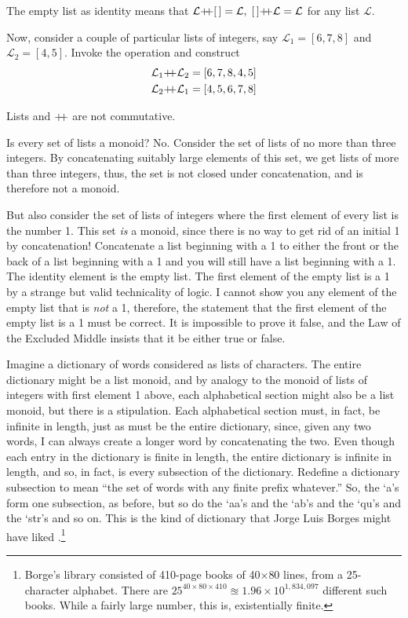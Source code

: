 The empty list as identity means that $\mathcal{L}\pp\emptylist=\mathcal{L},\; \emptylist\pp\mathcal{L}=\mathcal{L}$
for any list $\mathcal{L}$.


Now, consider a couple of particular lists of integers, say $\mathcal{L}_1=[6,7,8]$ and $\mathcal{L}_2=[4,5]$. Invoke the operation and construct
\begin{align*}
  \mathcal{L}_1 \pp \mathcal{L}_2 &= [6,7,8,4,5] \\
  \mathcal{L}_2 \pp \mathcal{L}_1 &= [4,5,6,7,8]
\end{align*}
\begin{observation}
  Lists and $\pp$ are not commutative.
\end{observation}


Is every set of lists a monoid? No. Consider the set of lists of no more than three integers. By concatenating suitably large elements of this set, we get lists of more than three integers, thus, the set is not closed under concatenation, and is therefore not a monoid.


But also consider the set of lists of integers where the first element of every list is the number 1. This set \emph{is} a monoid, since there is no way to get rid of an initial 1 by concatenation! Concatenate a list beginning with a 1 to either the front or the back of a list beginning with a 1 and you will still have a list beginning with a 1. The identity element is the empty list. The first element of the empty list is a 1 by a strange but valid technicality of logic. I cannot show you any element of the empty list that is \emph{not} a 1, therefore, the statement that the first element of the empty list is a 1 must be correct. It is impossible to prove it false, and the Law of the Excluded Middle insists that it be either true or false.


Imagine a dictionary of words considered as lists of characters. The entire dictionary might be a list monoid, and by analogy to the monoid of lists of integers with first element 1 above, each alphabetical section might also be a list monoid, but there is a stipulation. Each alphabetical section must, in fact, be infinite in length, just as must be the entire dictionary, since, given any two words, I can always create a longer word by concatenating the two. Even though each entry in the dictionary is finite in length, the entire dictionary is infinite in length, and so, in fact, is every subsection of the dictionary. Redefine a dictionary subsection to mean ``the set of words with any finite prefix whatever.'' So, the `a's form one subsection, as before, but so do the `aa's and the `ab's and the `qu's and the `str's and so on. This is the kind of dictionary that Jorge Luis Borges might have liked \cite{babel}.\footnote{Borge's library consisted of 410-page books of 40$\times$80 lines, from a 25-character alphabet. There are $25^{40\times 80\times 410}\approxeq1.96\times 10^{1,834,097}$ different such books. While a fairly large number, this is, existentially finite.}


